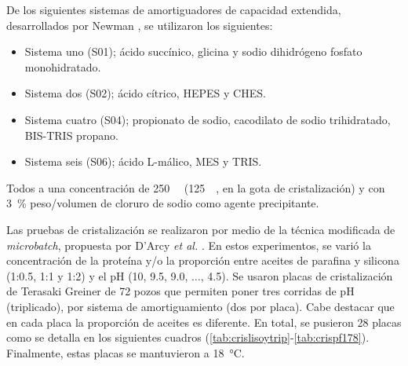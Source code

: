 \documentclass[11pt,letterpaper]{article}
\begin{document}
De los siguientes sistemas de amortiguadores de capacidad extendida, desarrollados por Newman \cite{Newman2004}, se utilizaron los siguientes: 
\begin{itemize}
\item Sistema uno (S01); ácido succínico, glicina y sodio dihidrógeno fosfato monohidratado.
\item Sistema dos (S02); ácido cítrico, HEPES y CHES.
\item Sistema cuatro (S04); propionato de sodio, cacodilato de sodio trihidratado, BIS-TRIS propano.
\item Sistema seis (S06); ácido L-málico, MES y TRIS.
\end{itemize}
Todos a una concentración de \SI{250}{\milli\Molar} (\SI{125}{\milli\Molar}, en la gota de cristalización) y con \SI{3}{\percent} peso/volumen de cloruro de sodio como agente precipitante. 
		
Las pruebas de cristalización se realizaron por medio de la técnica modificada de \emph{microbatch}, propuesta por D'Arcy \emph{et al.} \cite{DArcy1996}. En estos experimentos, se varió la concentración de la proteína y/o la proporción entre aceites de parafina y silicona (1:0.5, 1:1 y 1:2) y el pH (10, 9.5, 9.0, $\ldots$, 4.5). Se usaron placas de cristalización de Terasaki Greiner de \num{72} pozos que permiten poner tres corridas de pH (triplicado), por sistema de amortiguamiento (dos por placa). Cabe destacar que en cada placa la proporción de aceites es diferente. En total, se pusieron \num{28} placas como se detalla en los siguientes cuadros (\ref{tab:crislisoytrip}-\ref{tab:crispf178}). Finalmente, estas placas se mantuvieron a \SI{18}{\degreeCelsius}.
				
\end{document}
